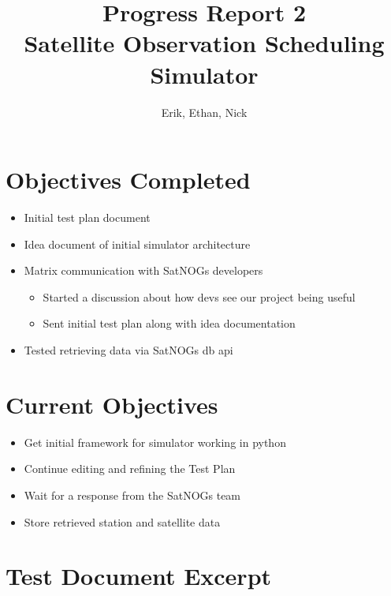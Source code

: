 \documentclass{article}
\title{Progress Report 2\\ Satellite Observation Scheduling Simulator}
\author{Erik, Ethan, Nick}
\begin{document}
\maketitle

\section{Objectives Completed}

\begin{itemize}
	\item Initial test plan document
	\item Idea document of initial simulator architecture
	\item Matrix communication with SatNOGs developers
    \begin{itemize}
      \item Started a discussion about how devs see our project being useful
      \item Sent initial test plan along with idea documentation
    \end{itemize}
	\item Tested retrieving data via SatNOGs db api
\end{itemize}

\section{Current Objectives}

\begin{itemize}
  \item Get initial framework for simulator working in python
  \item Continue editing and refining the Test Plan
  \item Wait for a response from the SatNOGs team
  \item Store retrieved station and satellite data
\end{itemize}

\section{Test Document Excerpt}
\end{document}
